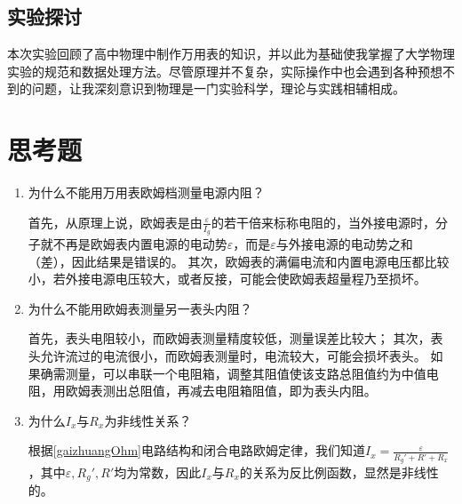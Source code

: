 \documentclass[]{../template/Report}
\begin{document}
\begin{fullreportonly}
\subsection{实验探讨}
本次实验回顾了高中物理中制作万用表的知识，并以此为基础使我掌握了大学物理实验的规范和数据处理方法。尽管原理并不复杂，实际操作中也会遇到各种预想不到的问题，让我深刻意识到物理是一门实验科学，理论与实践相辅相成。

\section{思考题}
\begin{enumerate}
    \item 为什么不能用万用表欧姆档测量电源内阻？

        首先，从原理上说，欧姆表是由$\frac{\varepsilon}{I_g}$的若干倍来标称电阻的，当外接电源时，分子就不再是欧姆表内置电源的电动势$\varepsilon$，而是$\varepsilon$与外接电源的电动势之和（差），因此结果是错误的。
        其次，欧姆表的满偏电流和内置电源电压都比较小，若外接电源电压较大，或者反接，可能会使欧姆表超量程乃至损坏。

    \item 为什么不能用欧姆表测量另一表头内阻？

        首先，表头电阻较小，而欧姆表测量精度较低，测量误差比较大；
        其次，表头允许流过的电流很小，而欧姆表测量时，电流较大，可能会损坏表头。
        如果确需测量，可以串联一个电阻箱，调整其阻值使该支路总阻值约为中值电阻，用欧姆表测出总阻值，再减去电阻箱阻值，即为表头内阻。

    \item 为什么$I_x$与$R_x$为非线性关系？

        根据\cref{gaizhuangOhm}电路结构和闭合电路欧姆定律，我们知道$I_x = \frac{\varepsilon}{R_g' + R' + R_x}$，其中$\varepsilon, R_g', R'$均为常数，因此$I_x$与$R_x$的关系为反比例函数，显然是非线性的。
\end{enumerate}
\end{fullreportonly}
\insertnotes
\end{document}
